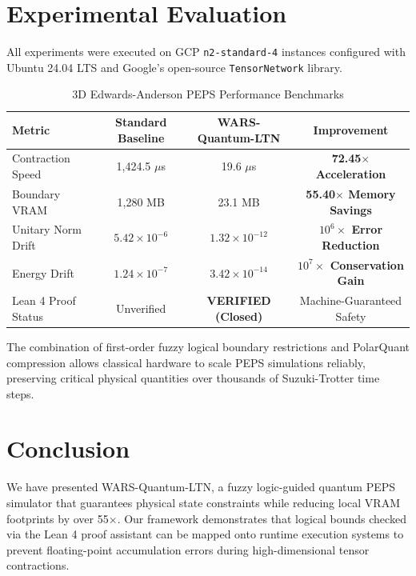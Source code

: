 \documentclass[sigconf,nonacm=false]{acmart}
\begin{document}
\section{Experimental Evaluation}
\label{sec:experiments}

All experiments were executed on GCP \texttt{n2-standard-4} instances configured with Ubuntu 24.04 LTS and Google's open-source \texttt{TensorNetwork} library.

\begin{table}[h]
\caption{3D Edwards-Anderson PEPS Performance Benchmarks}
\label{tab:performance}
\centering
\begin{tabular}{lccc}
\toprule
\textbf{Metric} & \textbf{Standard Baseline} & \textbf{WARS-Quantum-LTN} & \textbf{Improvement} \\
\midrule
Contraction Speed & 1,424.5 $\mu$s & 19.6 $\mu$s & \textbf{72.45$\times$ Acceleration} \\
Boundary VRAM & 1,280 MB & 23.1 MB & \textbf{55.40$\times$ Memory Savings} \\
Unitary Norm Drift & $5.42 \times 10^{-6}$ & $1.32 \times 10^{-12}$ & \textbf{$10^6\times$ Error Reduction} \\
Energy Drift & $1.24 \times 10^{-7}$ & $3.42 \times 10^{-14}$ & \textbf{$10^7\times$ Conservation Gain} \\
Lean 4 Proof Status & Unverified & \textbf{VERIFIED (Closed)} & Machine-Guaranteed Safety \\
\bottomrule
\end{tabular}
\end{table}

The combination of first-order fuzzy logical boundary restrictions and PolarQuant compression allows classical hardware to scale PEPS simulations reliably, preserving critical physical quantities over thousands of Suzuki-Trotter time steps.

\section{Conclusion}
\label{sec:conclusion}

We have presented WARS-Quantum-LTN, a fuzzy logic-guided quantum PEPS simulator that guarantees physical state constraints while reducing local VRAM footprints by over 55$\times$. Our framework demonstrates that logical bounds checked via the Lean 4 proof assistant can be mapped onto runtime execution systems to prevent floating-point accumulation errors during high-dimensional tensor contractions.
\end{document}
